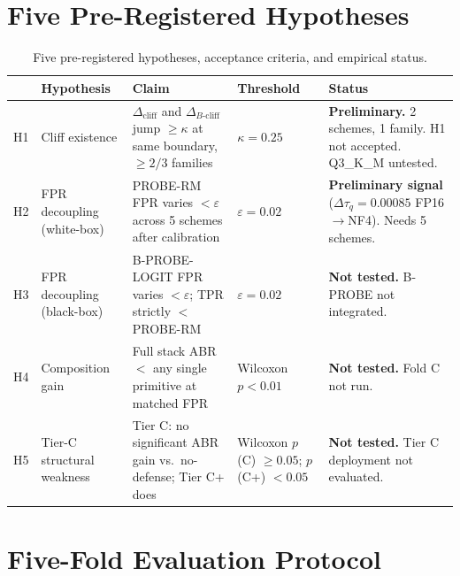 \documentclass[11pt,a4paper]{article}
\newcommand{\cliff}{\Delta_{\mathrm{cliff}}}
\newcommand{\bcliff}{\Delta_{B\text{-cliff}}}
\newcommand{\kap}{\kappa}
\newcommand{\tauq}{\tau_q}
\begin{document}
\section{Five Pre-Registered Hypotheses}
\label{sec:hypotheses}

\begin{table}[H]
  \centering
  \small
  \caption{Five pre-registered hypotheses, acceptance criteria, and empirical status.}
  \label{tab:hypotheses}
  \begin{tabularx}{\textwidth}{@{}lp{3.8cm}p{3.2cm}lX@{}}
    \toprule
    & Hypothesis & Claim & Threshold & \textbf{Status} \\
    \midrule
    H1 & Cliff existence & $\cliff$ and $\bcliff$ jump $\ge\kap$ at same boundary, $\ge 2/3$ families & $\kap = 0.25$ & \textcolor{orange!70!black}{\textbf{Preliminary.}} 2 schemes, 1 family. H1 not accepted. Q3\_K\_M untested. \\[4pt]
    H2 & FPR decoupling (white-box) & PROBE-RM FPR varies $< \varepsilon$ across 5 schemes after calibration & $\varepsilon = 0.02$ & \textcolor{orange!70!black}{\textbf{Preliminary signal}} ($\Delta\tauq = 0.00085$ FP16$\to$NF4). Needs 5 schemes. \\[4pt]
    H3 & FPR decoupling (black-box) & B-PROBE-LOGIT FPR varies $< \varepsilon$; TPR strictly $<$ PROBE-RM & $\varepsilon = 0.02$ & \textcolor{red!60!black}{\textbf{Not tested.}} B-PROBE not integrated. \\[4pt]
    H4 & Composition gain & Full stack ABR $<$ any single primitive at matched FPR & Wilcoxon $p < 0.01$ & \textcolor{red!60!black}{\textbf{Not tested.}} Fold C not run. \\[4pt]
    H5 & Tier-C structural weakness & Tier C: no significant ABR gain vs.\ no-defense; Tier C+ does & Wilcoxon $p$(C) $\ge 0.05$; $p$(C+) $< 0.05$ & \textcolor{red!60!black}{\textbf{Not tested.}} Tier C deployment not evaluated. \\
    \bottomrule
  \end{tabularx}
\end{table}

\section{Five-Fold Evaluation Protocol}
\label{sec:folds}
\end{document}
